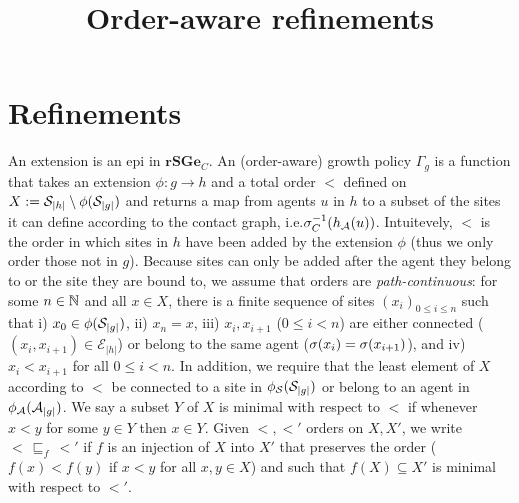 \documentclass[a4paper,12pt]{article}
\title{Order-aware refinements}
\newcommand{\ie}{i.e.\xspace}
\newcommand{\anon}[1]{\left|#1\right|}
\newcommand{\gp}{\Gamma}
\newcommand{\rSGe}{\mathbf{rSGe}}
\newcommand{\edges}{\mathcal{E}}
\begin{document}
\maketitle

\section{Refinements}

An extension is an epi in $\rSGe_C$.
An (order-aware) growth policy $\gp_g$ is a function
that takes an extension $\phi: g \to h$
and a total order $<$ defined on
$X := \sites_{\anon{h}} \setminus \phi(\sites_{\anon{g}})$
and returns a map from agents $u$ in $h$
to a subset of the sites it can define
according to the contact graph,
\ie $\sigma^{-1}_C(h_{\mathcal{A}}(u))$.
Intuitevely, $<$ is the order in which sites in $h$
have been added by the extension $\phi$
(thus we only order those not in $g$).
Because sites can only be added after
the agent they belong to
or the site they are bound to,
we assume that orders are \emph{path-continuous}:
for some $n \in \mathbb{N}$ and all $x \in X$,
there is a finite sequence of sites $(x_i)_{0 \leq i \leq n}$
such that i) $x_0 \in \phi(\sites_{\anon{g}})$,
ii) $x_n = x$,
iii) $x_i,x_{i+1}$ ($0 \leq i < n$)
are either connected ($(x_i,x_{i+1}) \in \edges_{\anon{h}}$)
or belong to the same agent ($\sigma(x_i) = \sigma(x_{i+1})$),
and iv) $x_i < x_{i+1}$ for all $0 \leq i < n$.
In addition,
we require that the least element of $X$ according to $<$
be connected to a site in $\phi_\sites(\sites_{\anon{g}})$
or belong to an agent in $\phi_\agents(\agents_{\anon{g}})$.
We say a subset $Y$ of $X$ is minimal with respect to $<$
if whenever $x < y$ for some $y \in Y$ then $x \in Y$. %
Given $<,<'$ orders on $X,X'$,
we write $< \,\sqsubseteq_f\, <'$ if
$f$ is an injection of $X$ into $X'$
that preserves the order
($f(x) < f(y)$ if $x < y$ for all $x,y \in X$)
and such that $f(X) \subseteq X'$ is minimal with respect to $<'$.
\end{document}
